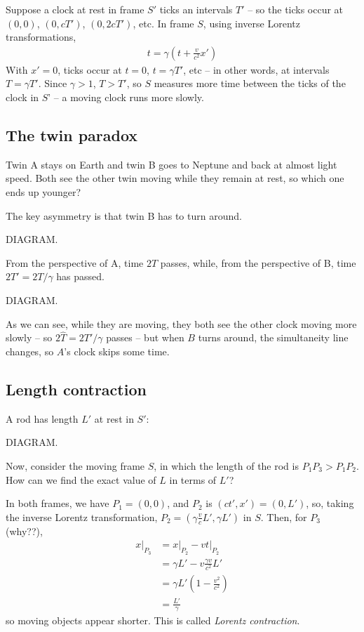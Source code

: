 \documentclass{../template/note}
\begin{document}
    Suppose a clock at rest in frame \(S'\) ticks an intervals \(T'\) -- so the ticks occur at \((0, 0)\), \((0, cT')\), \((0, 2cT')\), etc. In frame \(S\), using inverse Lorentz transformations,
    \begin{align*}
        t = \gamma \left(t + \frac v{c^2}x'\right)
    \end{align*}
    With \(x'=0\), ticks occur at \(t = 0\), \(t = \gamma T'\), etc -- in other words, at intervals \(T = \gamma T'\). Since \(\gamma > 1\), \(T > T'\), so \(S\) measures more time between the ticks of the clock in \(S\)' -- a moving clock runs more slowly.
    
    \subsection{The twin paradox}

    Twin A stays on Earth and twin B goes to Neptune and back at almost light speed. Both see the other twin moving while they remain at rest, so which one ends up younger?
    
    The key asymmetry is that twin B has to turn around.
    
    DIAGRAM.

    From the perspective of A, time \(2T\) passes, while, from the perspective of B, time \(2T' = 2T/\gamma\) has passed.

    DIAGRAM.

    As we can see, while they are moving, they both see the other clock moving more slowly -- so \(2\hat T = 2T'/\gamma\) passes -- but when \(B\) turns around, the simultaneity line changes, so \(A\)'s clock skips some time.

    \subsection{Length contraction}

    A rod has length \(L'\) at rest in \(S'\):

    DIAGRAM.

    Now, consider the moving frame \(S\), in which the length of the rod is \(P_1P_3 > P_1P_2\). How can we find the exact value of \(L\) in terms of \(L'\)?

    In both frames, we have \(P_1 = (0, 0)\), and \(P_2\) is \((ct', x') = (0, L')\), so, taking the inverse Lorentz transformation, \(P_2 = (\gamma \frac v c L', \gamma L')\) in \(S\). Then, for \(P_3\) (why??),
    \begin{align*}
        \left.x\right|_{P_3} &= \left.x\right|_{P_2} - \left.vt\right|_{P_2} \\
        &= \gamma L' - v \frac{\gamma v}{c^2}L' \\
        &= \gamma L' \left(1-\frac{v^2}{c^2}\right) \\
        &= \frac{L'}{\gamma}
    \end{align*}
    so moving objects appear shorter. This is called \emph{Lorentz contraction}.
\end{document}
